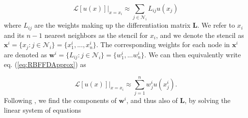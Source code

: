 \documentclass[10pt,a4paper]{article}
\begin{document}
\begin{equation}\label{eq:RBFFDApprox}
\mathcal{L}[u(x)]\big|_{x=x_i} \approx \sum_{j \in \mathcal{N}_i} L_{ij} u(x_j)
\end{equation}
where $L_{ij}$ are the weights making up the differentiation matrix $\mathbf{L}$.  We refer to $x_i$ and its $n-1$ nearest neighbors as the stencil for $x_i$, and we denote the stencil as $\mathbf{x}^i = \{x_j : j \in \mathcal{N}_i\} = \{x^i_1,..., x^i_n\}$. The corresponding weights for each node in $\mathbf{x}^i$ are denoted as $\mathbf{w}^i = \{L_{ij} : j \in \mathcal{N}_i\} = \{w^i_1,...w^i_n\}$.  We can then equivalently write eq. (\ref{eq:RBFFDApprox}) as 

\begin{equation}\label{eq:RBFFDApproxAlt}
\mathcal{L}[u(x)]\big|_{x=x_i} \approx \sum_{j=1}^n w^i_j u(x^i_j).
\end{equation}
Following \citet{Fornberg2015}, we find the components of $\mathbf{w}^i$, and thus also of $\mathbf{L}$, by solving the linear system of equations
\end{document}
